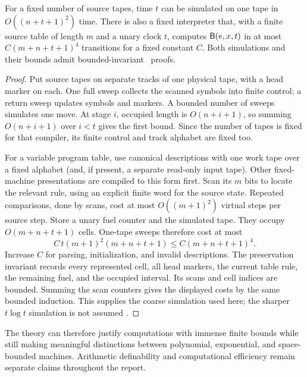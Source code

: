 \begin{theorem}\label{thm:F06}
For a fixed number of source tapes, time $t$ can be simulated on one tape in $O((n+t+1)^2)$ time. There is also a fixed interpreter that, with a finite source table of length $m$ and a unary clock $t$, computes $\mathsf B(e,x,t)$ in at most $C(m+n+t+1)^4$ transitions for a fixed constant $C$. Both simulations and their bounds admit bounded-invariant \ipra\ proofs.
\end{theorem}
\begin{proof}
Put source tapes on separate tracks of one physical tape, with a head marker on each. One full sweep collects the scanned symbols into finite control; a return sweep updates symbols and markers. A bounded number of sweeps simulates one move. At stage $i$, occupied length is $O(n+i+1)$, so summing $O(n+i+1)$ over $i<t$ gives the first bound. Since the number of tapes is fixed for that compiler, its finite control and track alphabet are fixed too.

For a variable program table, use canonical descriptions with one work tape over a fixed alphabet (and, if present, a separate read-only input tape). Other fixed-machine presentations are compiled to this form first. Scan its $m$ bits to locate the relevant rule, using an explicit finite word for the source state. Repeated comparisons, done by scans, cost at most $O((m+1)^2)$ virtual steps per source step. Store a unary fuel counter and the simulated tape. They occupy $O(m+n+t+1)$ cells. One-tape sweeps therefore cost at most
\[
 C\,t(m+1)^2(m+n+t+1)\le C(m+n+t+1)^4.
\]
Increase $C$ for parsing, initialization, and invalid descriptions. The preservation invariant records every represented cell, all head markers, the current table rule, the remaining fuel, and the occupied interval. Its scans and cell indices are bounded. Summing the scan counters gives the displayed costs by the same bounded induction. This supplies the coarse simulation used here; the sharper $t\log t$ simulation is not assumed \cite{HennieStearns1966}.
\end{proof}

The theory can therefore justify computations with immense finite bounds while still making meaningful distinctions between polynomial, exponential, and space-bounded machines. Arithmetic definability and computational efficiency remain separate claims throughout the report.
